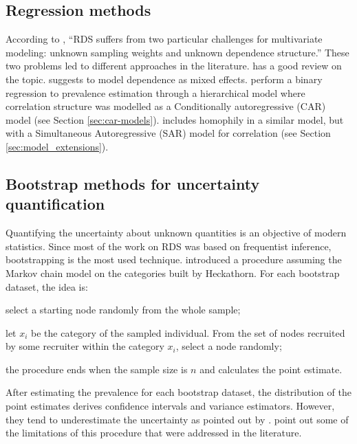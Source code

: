\subsection{Regression methods}

According to \textcite[p. 86]{gile2018methods}, ``RDS suffers from two particular challenges for multivariate modeling: unknown sampling weights
and unknown dependence structure.'' These two problems led to different
approaches in the literature. \textcite[p.
13-15]{avery2021statistical} has a good review on the
topic. \textcite{spiller2009regression} suggests to model dependence as mixed
effects. \textcite{bastos2012binary} perform a binary regression to
prevalence estimation through a hierarchical model where correlation structure
was modelled as a Conditionally autoregressive (CAR) model (see Section \ref{sec:car-models}).
\textcite{yauck2021general} includes homophily in a similar model, but with a
Simultaneous Autoregressive (SAR) model \cite[p. 98]{banerjee2003hierarchical}
for correlation (see Section \ref{sec:model_extensions}).

\subsection{Bootstrap methods for uncertainty quantification}

Quantifying the uncertainty about unknown quantities is an objective of modern
statistics. Since most of the work on RDS
was based on frequentist inference, bootstrapping is the most used technique.
\cite{salganik2006variance} introduced a procedure assuming the Markov chain
model on the categories built by Heckathorn. For each bootstrap dataset, the
idea is:
\begin{alineas}
  \item select a starting node randomly from the whole sample;
  \item let $x_i$ be the category of the sampled individual. From the set of
  nodes recruited by some recruiter within the category $x_i$, select a node randomly;
  \item the procedure ends when the sample size is $n$ and calculates the point estimate. 
\end{alineas}
After estimating the prevalence for each bootstrap dataset, 
the distribution of the point estimates derives confidence intervals and 
variance estimators. However, they tend to underestimate the uncertainty as
pointed out by \textcite[p. 6746]{goel2010assessing}. \textcite[p.
80]{gile2018methods} point out some of the
limitations of this procedure that were addressed in the literature.


